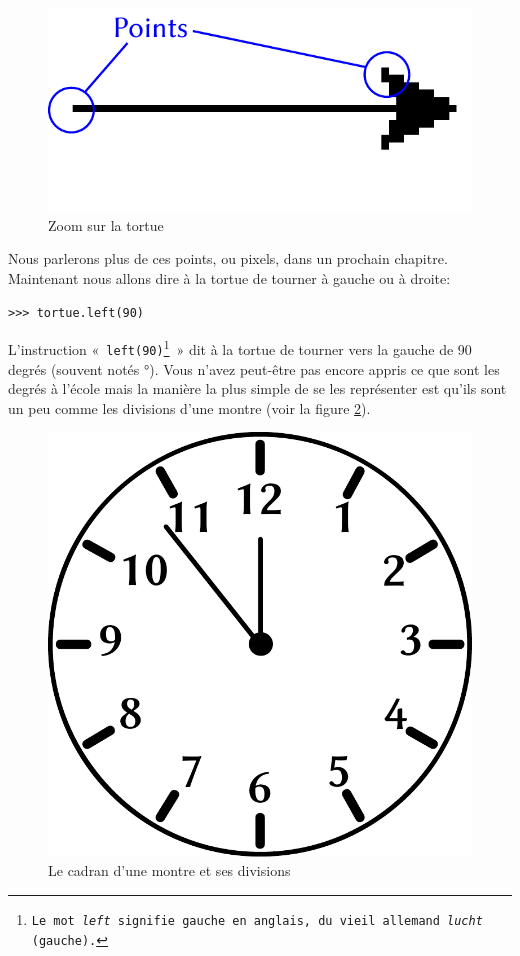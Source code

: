 \begin{figure}[h!]
\centering
\includegraphics[scale=1]{images/points.pdf}
\caption{Zoom sur la tortue}
\label{fig:points}
\end{figure}

Nous parlerons plus de ces points, ou pixels, dans un prochain chapitre.
Maintenant nous allons dire à la tortue de tourner à gauche ou à droite:

\begin{Verbatim}[frame=single,rulecolor=\color{mbleu}, label=à taper]
>>> tortue.left(90)
\end{Verbatim}

L'instruction «~\texttt{left(90)\footnote{Le mot \emph{left} signifie gauche en anglais, du vieil allemand \emph{lucht} (gauche).}}~»  dit à la tortue de tourner vers la gauche de 90 degrés (souvent notés °). Vous n'avez peut-être pas encore appris ce que sont les degrés à l'école mais la manière la plus simple de se les représenter est qu'ils sont un peu comme les divisions d'une montre (voir la figure \ref{fig:clock}).
\begin{figure}[H]
\centering
\includegraphics[scale=0.5]{images/clock.pdf}
\caption{Le cadran d'une montre et ses divisions}
\label{fig:clock}
\end{figure}

